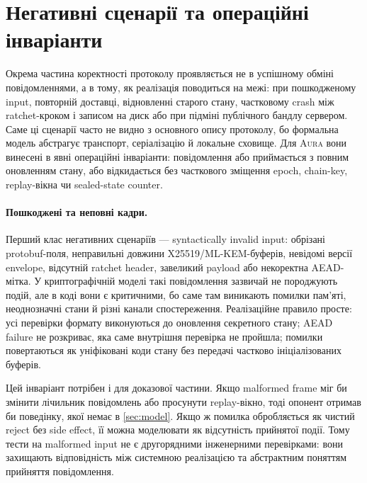 \documentclass[11pt,a4paper]{article}
\theoremstyle{definition}
\newcommand{\Aura}{\mbox{\normalfont\scshape Aura}}
\begin{document}
\section{Негативні сценарії та операційні інваріанти}
\label{sec:negative-scenarios}

Окрема частина коректності протоколу проявляється не в успішному
обміні повідомленнями, а в тому, як реалізація поводиться на межі:
при пошкодженому input, повторній доставці, відновленні старого стану,
частковому crash між ratchet-кроком і записом на диск або при
підміні публічного бандлу сервером. Саме ці сценарії часто не видно з
основного опису протоколу, бо формальна модель абстрагує транспорт,
серіалізацію й локальне сховище. Для \Aura{} вони винесені в явні
операційні інваріанти: повідомлення або приймається з повним
оновленням стану, або відкидається без часткового зміщення epoch,
chain-key, replay-вікна чи sealed-state counter.

\paragraph{Пошкоджені та неповні кадри.}
Перший клас негативних сценаріїв — syntactically invalid input:
обрізані protobuf-поля, неправильні довжини X25519/ML-KEM-буферів,
невідомі версії envelope, відсутній ratchet header, завеликий payload
або некоректна AEAD-мітка. У криптографічній моделі такі повідомлення
зазвичай не породжують подій, але в коді вони є критичними, бо саме
там виникають помилки пам'яті, неоднозначні стани й різні канали
спостереження. Реалізаційне правило просте: усі перевірки формату
виконуються до оновлення секретного стану; AEAD failure не розкриває,
яка саме внутрішня перевірка не пройшла; помилки повертаються як
уніфіковані коди стану без передачі частково ініціалізованих буферів.

Цей інваріант потрібен і для доказової частини. Якщо malformed frame
міг би змінити лічильник повідомлень або просунути replay-вікно, тоді
опонент отримав би поведінку, якої немає в \cref{sec:model}. Якщо ж
помилка обробляється як чистий reject без side effect, її можна
моделювати як відсутність прийнятої події. Тому тести на malformed
input не є другорядними інженерними перевірками: вони захищають відповідність між
системною реалізацією та абстрактним поняттям прийняття повідомлення.
\end{document}
